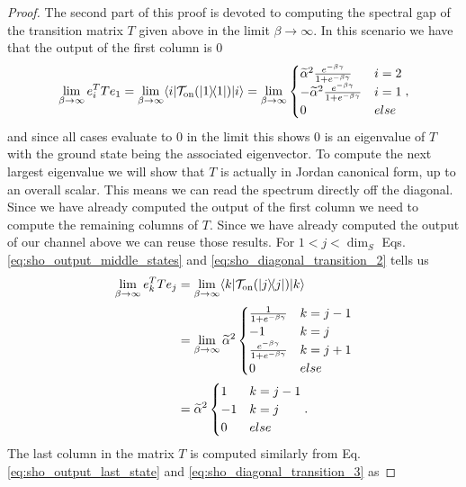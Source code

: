 \documentclass{article}
\newcommand{\on}{\rm on}
\newcommand{\ket}[1]{|#1\rangle}
\newcommand{\bra}[1]{\langle #1|}
\newcommand{\ketbra}[2]{| #1\rangle\! \langle #2|}
\begin{document}
\begin{proof}
The second part of this proof is devoted to computing the spectral gap of the transition matrix $T$ given above in the limit $\beta \to \infty$. In this scenario we have that the output of the first column is 0 
\begin{equation}
 \lim_{\beta \to \infty} e_i^T T e_1 = \lim_{\beta \to \infty} \bra{i} \mathcal{T}_{\on}(\ketbra{1}{1})\ket{i} = \lim_{\beta \to \infty} \begin{cases} \widetilde{\alpha}^2 \frac{e^{-\beta \gamma}}{1 + e^{-\beta \gamma}} & i = 2 \\
 - \widetilde{\alpha}^2 \frac{e^{-\beta \gamma}}{1 + e^{-\beta \gamma}} & i = 1 \\
 0 & else \end{cases},
\end{equation}
and since all cases evaluate to 0 in the limit this shows 0 is an eigenvalue of $T$ with the ground state being the associated eigenvector. To compute the next largest eigenvalue we will show that $T$ is actually in Jordan canonical form, up to an overall scalar. This means we can read the spectrum directly off the diagonal. Since we have already computed the output of the first column we need to compute the remaining columns of $T$. Since we have already computed the output of our channel above we can reuse those results. For $1 < j < \dim_S$ Eqs. \eqref{eq:sho_output_middle_states} and \eqref{eq:sho_diagonal_transition_2} tells us
\begin{align}
    \lim_{\beta \to \infty} e_k^T T e_j &= \lim_{\beta \to \infty} \bra{k} \mathcal{T}_{\on}(\ketbra{j}{j}) \ket{k} \\
    &= \lim_{\beta \to \infty} \widetilde{\alpha}^2\begin{cases}
        \frac{1}{1 + e^{-\beta \gamma}} & k = j - 1 \\
        -1 & k = j \\
        \frac{e^{-\beta \gamma}}{1 + e^{-\beta \gamma}} & k = j + 1 \\
        0 & else
    \end{cases} \\
    &= \widetilde{\alpha}^2 
    \begin{cases}
        1 & k = j - 1 \\
        -1 & k = j \\
        0 & else
    \end{cases}.
\end{align}
The last column in the matrix $T$ is computed similarly from Eq. \eqref{eq:sho_output_last_state} and \eqref{eq:sho_diagonal_transition_3} as

\end{proof}
\end{document}
